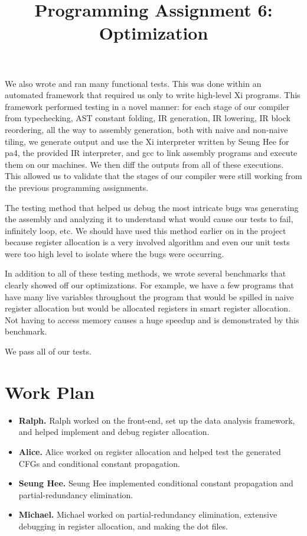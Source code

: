 \documentclass{hw} \title{Programming Assignment 6:\\ Optimization}
\begin{document}
We also wrote and ran many functional tests. This was done within an automated
framework that required us only to write high-level Xi programs. This framework
performed testing in a novel manner: for each stage of our compiler from
typechecking, AST constant folding, IR generation, IR lowering, IR block
reordering, all the way to assembly generation, both with naive and non-naive
tiling, we generate output and use the Xi interpreter written by Seung Hee for
pa4, the provided IR interpreter, and gcc to link assembly programs and execute
them on our machines. We then diff the outputs from all of these executions.
This allowed us to validate that the stages of our compiler were still working
from the previous programming assignments.

The testing method that helped us debug the most intricate bugs was generating
the assembly and analyzing it to understand what would cause our tests to fail,
infinitely loop, etc. We should have used this method earlier on in the project
because register allocation is a very involved algorithm and even our unit
tests were too high level to isolate where the bugs were occurring.

In addition to all of these testing methods, we wrote several benchmarks that
clearly showed off our optimizations. For example, we have a few programs that
have many live variables throughout the program that would be spilled in naive
register allocation but would be allocated registers in smart register
allocation. Not having to access memory causes a huge speedup and is
demonstrated by this benchmark.

We pass all of our tests.  \section{Work Plan}\label{sec:workplan}
\begin{itemize} \item \textbf{Ralph.} Ralph worked on the front-end, set up the
      data analysis framework, and helped implement and debug register
      allocation.

  \item \textbf{Alice.} Alice worked on register allocation and helped test the
    generated CFGs and conditional constant propagation.

  \item \textbf{Seung Hee.} Seung Hee implemented conditional constant
    propagation and partial-redundancy elimination.

  \item \textbf{Michael.} Michael worked on partial-redundancy elimination,
extensive debugging in register allocation, and making the dot files.
\end{itemize}
\end{document}
